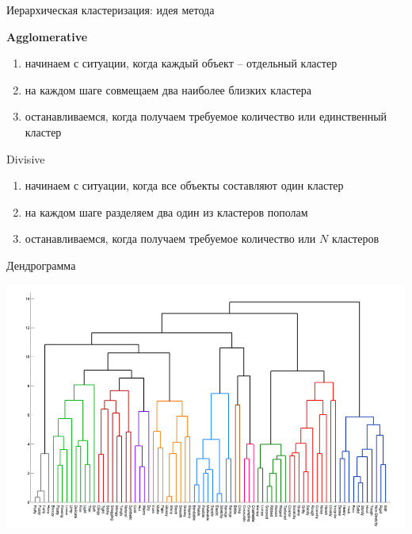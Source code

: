 \documentclass[10pt]{beamer}
\begin{document}
\begin{frame}{Иерархическая кластеризация: идея метода}

{\bf Agglomerative}
\begin{enumerate}
\item начинаем с ситуации, когда каждый объект -- отдельный кластер
\item на каждом шаге совмещаем два наиболее близких кластера
\item останавливаемся, когда получаем требуемое количество или единственный кластер
\end{enumerate}

\vspace{1em}
Divisive
\begin{enumerate}
\item начинаем с ситуации, когда все объекты составляют один кластер
\item на каждом шаге разделяем два один из кластеров пополам
\item останавливаемся, когда получаем требуемое количество или $N$ кластеров
\end{enumerate}

\end{frame}

\begin{frame}{Дендрограмма}

\begin{center}
\includegraphics[scale=0.3]{images/dendro.png}
\end{center}

\end{frame}
\end{document}
